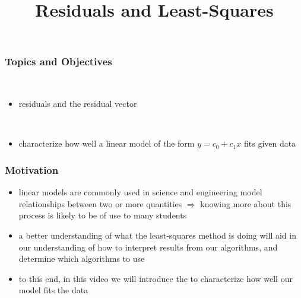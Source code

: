 \title{Residuals and Least-Squares}
\subtitle{\SubTitleName}
\institute[]{\Course}
\author{\Instructor}
\maketitle   


\begin{frame}\frametitle{Topics and Objectives}
     \\
    \begin{itemize}
    
        \item residuals and the residual vector
        
    \end{itemize}
    
    \vspace{0.5cm}
    
    \\
    
    \begin{itemize}
    
        \item characterize how well a linear model of the form $y = c_0 + c_1 x$ fits given data
      
    \end{itemize}
    
    \vspace{0.25cm} 
 
\end{frame}
 
 
 


 



\begin{frame}
\frametitle{Motivation}

    \begin{itemize}
        \item<2-> linear models are commonly used in science and engineering model relationships between two or more quantities $\Rightarrow$ knowing more about this process is likely to be of use to many students
        
        \item<3-> a better understanding of what the least-squares method is doing will aid in our understanding of how to interpret results from our algorithms, and determine which algorithms to use
        
        \item<4-> to this end, in this video we will introduce the  to characterize how well our model fits the data
        
    \end{itemize}

\end{frame}


